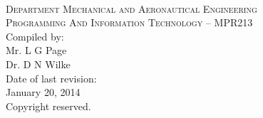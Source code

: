 \begin{titlepage}
    \thispagestyle{empty}
    \begin{center}
        \ \\
        \vspace{2cm}
        {\Large \textsc{Department Mechanical and Aeronautical
                        Engineering}} \\
        \vspace{1.5cm}
        {\huge \textsc{Programming And Information Technology -- MPR213}} \\
        \vspace{2.5cm}
        {\large Compiled by:} \\
        \vspace{0.2cm}
        {\large Mr. L G Page} \\
        {\large Dr. D N Wilke} \\
        \vspace{1cm}
        {\large Date of last revision:} \\
        \vspace{0.2cm}
        {\large January 20, 2014} \\
        \vspace{1cm}
        {\large Copyright reserved.} \\
    \end{center}
\end{titlepage}
